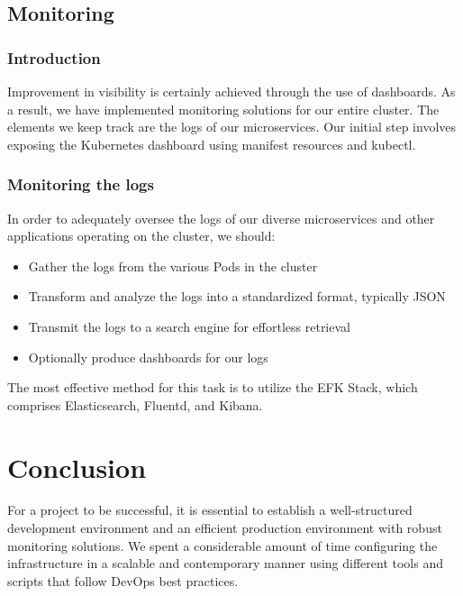 \subsection{Monitoring}
\subsubsection{Introduction}
Improvement in visibility is certainly achieved through the use of dashboards. As a result, we have implemented monitoring solutions for our entire cluster. The elements we keep track are the logs of our microservices. Our initial step involves exposing the Kubernetes dashboard using manifest resources and kubectl.

\subsubsection{Monitoring the logs}

In order to adequately oversee the logs of our diverse microservices and other applications operating on the cluster, we should:

\begin{itemize}
  \item Gather the logs from the various Pods in the cluster
  \item Transform and analyze the logs into a standardized format, typically JSON
  \item Transmit the logs to a search engine for effortless retrieval
  \item Optionally produce dashboards for our logs

\end{itemize}

The most effective method for this task is to utilize the EFK Stack, which comprises Elasticsearch, Fluentd, and Kibana.


\section{Conclusion}

For a project to be successful, it is essential to establish a well-structured development environment and an efficient production environment with robust monitoring solutions. We spent a considerable amount of time configuring the infrastructure in a scalable and contemporary manner using different tools and scripts that follow DevOps best practices.